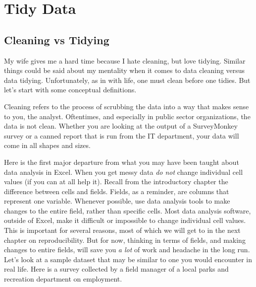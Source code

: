 \documentclass[]{book}
\begin{document}
\hypertarget{tidy-data}{%
\chapter{Tidy Data}\label{tidy-data}}

\hypertarget{cleaning-vs-tidying}{%
\section{Cleaning vs Tidying}\label{cleaning-vs-tidying}}

My wife gives me a hard time because I hate cleaning, but love tidying. Similar things could be said about my mentality when it comes to data cleaning versus data tidying. Unfortunately, as in with life, one must clean before one tidies. But let's start with some conceptual definitions.

Cleaning refers to the process of scrubbing the data into a way that makes sense to you, the analyst. Oftentimes, and especially in public sector organizations, the data is not clean. Whether you are looking at the output of a SurveyMonkey survey or a canned report that is run from the IT department, your data will come in all shapes and sizes.

Here is the first major departure from what you may have been taught about data analysis in Excel. When you get messy data \emph{do not} change individual cell values (if you can at all help it). Recall from the introductory chapter the difference between cells and fields. Fields, as a reminder, are columns that represent one variable. Whenever possible, use data analysis tools to make changes to the entire field, rather than specific cells. Most data analysis software, outside of Excel, make it difficult or impossible to change individual cell values. This is important for several reasons, most of which we will get to in the next chapter on reproducibility. But for now, thinking in terms of fields, and making changes to entire fields, will save you \emph{a lot} of work and headache in the long run. Let's look at a sample dataset that may be similar to one you would encounter in real life. Here is a survey collected by a field manager of a local parks and recreation department on employment.
\end{document}
